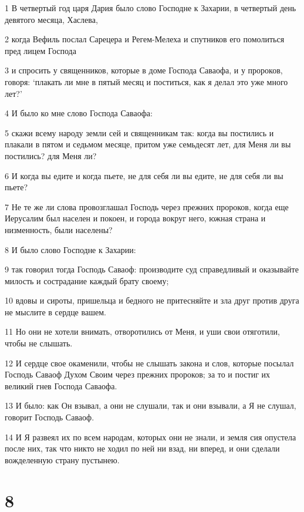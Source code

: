 \par 1 В четвертый год царя Дария было слово Господне к Захарии, в четвертый день девятого месяца, Хаслева,
\par 2 когда Вефиль послал Сарецера и Регем-Мелеха и спутников его помолиться пред лицем Господа
\par 3 и спросить у священников, которые в доме Господа Саваофа, и у пророков, говоря: `плакать ли мне в пятый месяц и поститься, как я делал это уже много лет?'
\par 4 И было ко мне слово Господа Саваофа:
\par 5 скажи всему народу земли сей и священникам так: когда вы постились и плакали в пятом и седьмом месяце, притом уже семьдесят лет, для Меня ли вы постились? для Меня ли?
\par 6 И когда вы едите и когда пьете, не для себя ли вы едите, не для себя ли вы пьете?
\par 7 Не те же ли слова провозглашал Господь через прежних пророков, когда еще Иерусалим был населен и покоен, и города вокруг него, южная страна и низменность, были населены?
\par 8 И было слово Господне к Захарии:
\par 9 так говорил тогда Господь Саваоф: производите суд справедливый и оказывайте милость и сострадание каждый брату своему;
\par 10 вдовы и сироты, пришельца и бедного не притесняйте и зла друг против друга не мыслите в сердце вашем.
\par 11 Но они не хотели внимать, отворотились от Меня, и уши свои отяготили, чтобы не слышать.
\par 12 И сердце свое окаменили, чтобы не слышать закона и слов, которые посылал Господь Саваоф Духом Своим через прежних пророков; за то и постиг их великий гнев Господа Саваофа.
\par 13 И было: как Он взывал, а они не слушали, так и они взывали, а Я не слушал, говорит Господь Саваоф.
\par 14 И Я развеял их по всем народам, которых они не знали, и земля сия опустела после них, так что никто не ходил по ней ни взад, ни вперед, и они сделали вожделенную страну пустынею.

\chapter{8}

